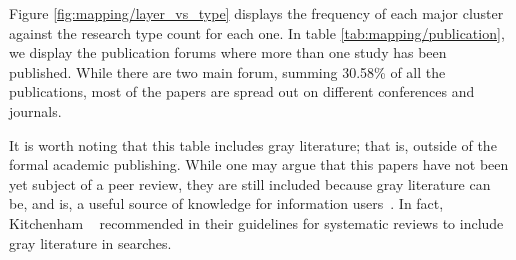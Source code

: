 Figure \ref{fig:mapping/layer_vs_type} displays the frequency of each major cluster
against the research type count for each one. In table \ref{tab:mapping/publication},
we display the publication forums where more than one study has been published.
While there are two main forum, summing 30.58\% of all the publications,
most of the papers are spread out on different conferences and journals.

It is worth noting that this table includes gray literature; that is, outside of the
formal academic publishing.
While one may argue that this papers have not been yet subject of a peer
review, they are still included because gray literature can be, and is, a useful
source of knowledge for information users~\cite{Lawrence2015}. In fact,
Kitchenham \etal~\cite{Kitchenham2007} recommended in their guidelines for systematic
reviews to include gray literature in searches.

